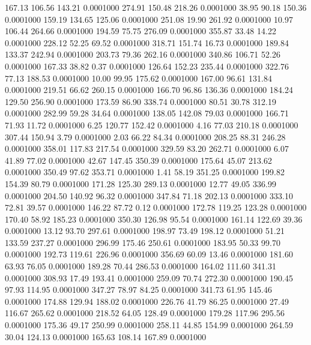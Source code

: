  167.13  106.56  143.21   0.0001000
 274.91  150.48  218.26   0.0001000
  38.95   90.18  150.36   0.0001000
 159.19  134.65  125.06   0.0001000
 251.08   19.90  261.92   0.0001000
  10.97  106.44  264.66   0.0001000
 194.59   75.75  276.09   0.0001000
 355.87   33.48   14.22   0.0001000
 228.12   52.25   69.52   0.0001000
 318.71  151.74   16.73   0.0001000
 189.84  133.37  242.94   0.0001000
 203.73   79.36  262.16   0.0001000
 340.86  106.71   52.26   0.0001000
 167.33   38.82    0.37   0.0001000
 126.64  152.23  235.44   0.0001000
 322.76   77.13  188.53   0.0001000
  10.00   99.95  175.62   0.0001000
 167.00   96.61  131.84   0.0001000
 219.51   66.62  260.15   0.0001000
 166.70   96.86  136.36   0.0001000
 184.24  129.50  256.90   0.0001000
 173.59   86.90  338.74   0.0001000
  80.51   30.78  312.19   0.0001000
 282.99   59.28   34.64   0.0001000
 138.05  142.08   79.03   0.0001000
 166.71   71.93   11.72   0.0001000
   6.25  120.77  152.42   0.0001000
   4.16   77.03  210.18   0.0001000
 307.44  150.94    3.79   0.0001000
   2.03   66.22   84.34   0.0001000
 208.25   88.31  246.28   0.0001000
 358.01  117.83  217.54   0.0001000
 329.59   83.20  262.71   0.0001000
   6.07   41.89   77.02   0.0001000
  42.67  147.45  350.39   0.0001000
 175.64   45.07  213.62   0.0001000
 350.49   97.62  353.71   0.0001000
   1.41   58.19  351.25   0.0001000
 199.82  154.39   80.79   0.0001000
 171.28  125.30  289.13   0.0001000
  12.77   49.05  336.99   0.0001000
 204.50  140.92   96.32   0.0001000
 347.84   71.18  202.13   0.0001000
 333.10   72.81   39.57   0.0001000
 146.22   87.72    0.12   0.0001000
 172.78  119.25  123.28   0.0001000
 170.40   58.92  185.23   0.0001000
 350.30  126.98   95.54   0.0001000
 161.14  122.69   39.36   0.0001000
  13.12   93.70  297.61   0.0001000
 198.97   73.49  198.12   0.0001000
  51.21  133.59  237.27   0.0001000
 296.99  175.46  250.61   0.0001000
 183.95   50.33   99.70   0.0001000
 192.73  119.61  226.96   0.0001000
 356.69   60.09   13.46   0.0001000
 181.60   63.93   76.05   0.0001000
 189.28   70.44  286.53   0.0001000
 164.02  111.60  341.31   0.0001000
 308.93   17.49  193.41   0.0001000
 259.09   70.74  272.30   0.0001000
 190.45   97.93  114.95   0.0001000
 347.27   78.97   84.25   0.0001000
 341.73   61.95  145.46   0.0001000
 174.88  129.94  188.02   0.0001000
 226.76   41.79   86.25   0.0001000
  27.49  116.67  265.62   0.0001000
 218.52   64.05  128.49   0.0001000
 179.28  117.96  295.56   0.0001000
 175.36   49.17  250.99   0.0001000
 258.11   44.85  154.99   0.0001000
 264.59   30.04  124.13   0.0001000
 165.63  108.14  167.89   0.0001000
